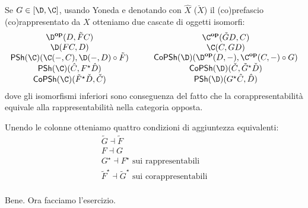 Se $G\in[\D,\C]$, usando Yoneda e denotando con $\hat{X}$ ($\check{X}$) il (co)prefascio (co)rappresentato da $X$ otteniamo due cascate di oggetti isomorfi:
\[
\begin{array}{c}
\D^{\bf op}( D, \tilde{F}C ) \\
\D( FC, D ) \\
\textsf{PSh}(\C)( \C(-,C), \D(-,D) \circ \tilde{F} ) \\
\textsf{PSh}(\C)( \hat{C}, F^\star\hat{D} ) \\
\textsf{CoPSh}(\C)( \tilde{F}^\star\check{D}, \check{C} )
\end{array}
\qquad
\begin{array}{c}
\C^{\bf op}( \tilde{G}D, C ) \\
\C( C, GD ) \\
\textsf{CoPSh}(\D)( \D^{\bf op}(D,-), \C^{\bf op}(C,-) \circ G ) \\
\textsf{CoPSh}(\D)( \check{C}, \tilde{G}^\star\check{D} ) \\
\textsf{PSh}(\D)( G^\star\hat{C}, \hat{D} )
\end{array}
\]
dove gli isomorfismi inferiori sono conseguenza del fatto che la corappresentabilità equivale alla rappresentabilità nella categoria opposta.

Unendo le colonne otteniamo quattro condizioni di aggiuntezza equivalenti:
\[
\begin{array}{c}
\tilde{G} \dashv \tilde{F} \\
F \dashv G \\
G^\star \dashv F^\star \text{ sui rappresentabili}\\
\tilde{F}^\star \dashv \tilde{G}^\star \text{ sui corappresentabili}\\
\end{array}
\]

Bene. Ora facciamo l'esercizio.

